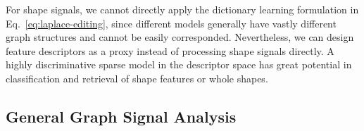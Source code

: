 For shape signals, we cannot directly apply the dictionary learning formulation in
Eq.~\ref{eq:laplace-editing}, since different models generally have vastly different
graph structures and cannot be easily corresponded. Nevertheless, we can design feature
descriptors as a proxy instead of processing shape signals directly. A highly discriminative
sparse model in the descriptor space has great potential in classification and retrieval of
shape features or whole shapes.

\subsection*{General Graph Signal Analysis}


